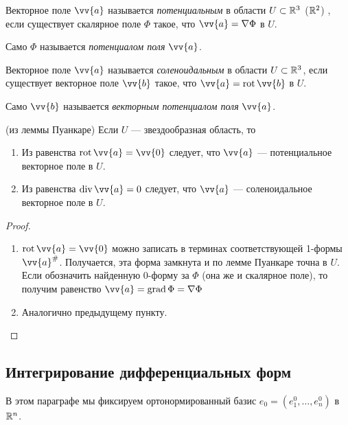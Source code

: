 \begin{definition}
	Векторное поле $\vv{a}$ называется \textit{потенциальным} в области $U \subset \mathbb{R}^3$ ($\mathbb{R}^2$) , если существует скалярное поле $\Phi$ такое, что $\vv{a} = \nabla \Phi$ в $U$.
	
	Само $\Phi$ называется \textit{потенциалом поля} $\vv{a}$.
\end{definition}

\begin{definition}
	Векторное поле $\vv{a}$ называется \textit{соленоидальным} в области $U \subset \mathbb{R}^3$, если существует векторное поле $\vv{b}$ такое, что $\vv{a} = \rot \vv{b}$ в $U$.
	
	Само $\vv{b}$ называется \textit{векторным потенциалом поля} $\vv{a}$.
\end{definition}

\begin{corollary} (из леммы Пуанкаре)
	Если $U$ --- звездообразная область, то
	\begin{enumerate}
		\item Из равенства $\rot \vv{a} = \vv{0}$ следует, что $\vv{a}$ --- потенциальное векторное поле в $U$.
		
		\item Из равенства $\Div \vv{a} = 0$ следует, что $\vv{a}$ --- соленоидальное векторное поле в $U$.
	\end{enumerate}
\end{corollary}

\begin{proof}~
	\begin{enumerate}
		\item $\rot \vv{a} = \vv{0}$ можно записать в терминах соответствующей 1-формы $\vv{a}^\#$. Получается, эта форма замкнута и по лемме Пуанкаре точна в $U$. Если обозначить найденную 0-форму за $\Phi$ (она же и скалярное поле), то получим равенство $\vv{a} = \grad \Phi = \nabla \Phi$
		
		\item Аналогично предыдущему пункту.
	\end{enumerate}
\end{proof}

\subsection{Интегрирование дифференциальных форм}

\begin{note}
	В этом параграфе мы фиксируем ортонормированный базис $e_0 = (e_1^0, \ldots, e_n^0)$ в $\mathbb{R}^n$.
\end{note}

